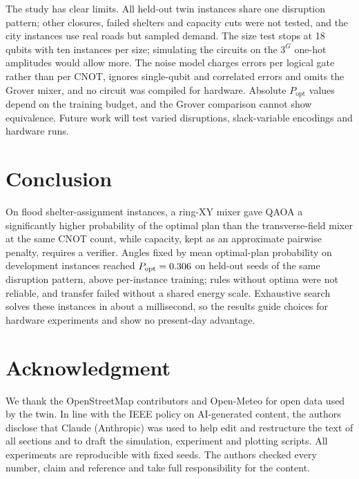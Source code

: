 \documentclass[conference]{IEEEtran}
\begin{document}
The study has clear limits. All held-out twin instances share one disruption pattern; other closures, failed shelters and capacity cuts were not tested, and the city instances use real roads but sampled demand. The size test stops at 18 qubits with ten instances per size; simulating the circuits on the $3^G$ one-hot amplitudes would allow more. The noise model charges errors per logical gate rather than per CNOT, ignores single-qubit and correlated errors and omits the Grover mixer, and no circuit was compiled for hardware. Absolute $P_{\mathrm{opt}}$ values depend on the training budget, and the Grover comparison cannot show equivalence. Future work will test varied disruptions, slack-variable encodings and hardware runs.

\section{Conclusion}
On flood shelter-assignment instances, a ring-XY mixer gave QAOA a significantly higher probability of the optimal plan than the transverse-field mixer at the same CNOT count, while capacity, kept as an approximate pairwise penalty, requires a verifier. Angles fixed by mean optimal-plan probability on development instances reached $P_{\mathrm{opt}}=0.306$ on held-out seeds of the same disruption pattern, above per-instance training; rules without optima were not reliable, and transfer failed without a shared energy scale. Exhaustive search solves these instances in about a millisecond, so the results guide choices for hardware experiments and show no present-day advantage.

\section*{Acknowledgment}
We thank the OpenStreetMap contributors and Open-Meteo for open data used by the twin.
In line with the IEEE policy on AI-generated content, the authors disclose that Claude (Anthropic) was used to help edit and restructure the text of all sections and to draft the simulation, experiment and plotting scripts. All experiments are reproducible with fixed seeds. The authors checked every number, claim and reference and take full responsibility for the content.
\end{document}
